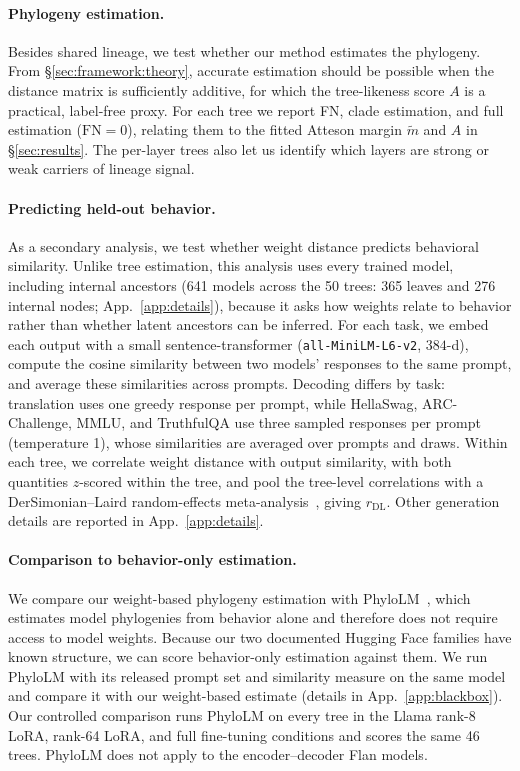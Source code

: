 \documentclass{article}
\theoremstyle{definition}
\theoremstyle{plain}
\begin{document}
\paragraph{Phylogeny estimation.}
\label{sec:exp:weights}
Besides shared lineage, we test whether our method estimates the phylogeny. From \S\ref{sec:framework:theory}, accurate estimation should be possible when the distance matrix is sufficiently additive, for which the tree-likeness score $A$ is a practical, label-free proxy. For each tree we report FN, clade estimation, and full estimation ($\mathrm{FN}=0$), relating them to the fitted Atteson margin $\widetilde m$ and $A$ in \S\ref{sec:results}. The per-layer trees also let us identify which layers are strong or weak carriers of lineage signal.


\paragraph{Predicting held-out behavior.}
\label{sec:exp:behavioral}
As a secondary analysis, we test whether weight distance predicts behavioral similarity. Unlike tree estimation, this analysis uses every trained model, including internal ancestors (641 models across the 50 trees: 365 leaves and 276 internal nodes; App.~\ref{app:details}), because it asks how weights relate to behavior rather than whether latent ancestors can be inferred. For each task, we embed each output with a small sentence-transformer (\texttt{all-MiniLM-L6-v2}, $384$-d), compute the cosine similarity between two models' responses to the same prompt, and average these similarities across prompts. Decoding differs by task: translation uses one greedy response per prompt, while HellaSwag, ARC-Challenge, MMLU, and TruthfulQA use three sampled responses per prompt (temperature 1), whose similarities are averaged over prompts and draws. Within each tree, we correlate weight distance with output similarity, with both quantities $z$-scored within the tree, and pool the tree-level correlations with a DerSimonian--Laird random-effects meta-analysis~\citep{dersimonianlaird1986}, giving $r_{\mathrm{DL}}$. Other generation details are reported in App.~\ref{app:details}.




\paragraph{Comparison to behavior-only estimation.}
\label{sec:exp:blackbox}
We compare our weight-based phylogeny estimation with PhyloLM~\citep{yax2025phylolm}, which estimates model phylogenies from behavior alone and therefore does not require access to model weights. Because our two documented Hugging Face families have known structure, we can score behavior-only estimation against them. We run PhyloLM with its released prompt set and similarity measure on the same model and compare it with our weight-based estimate (details in App.~\ref{app:blackbox}). Our controlled comparison runs PhyloLM on every tree in the Llama rank-8 LoRA, rank-64 LoRA, and full fine-tuning conditions and scores the same 46 trees. PhyloLM does not apply to the encoder--decoder Flan models.
\end{document}
